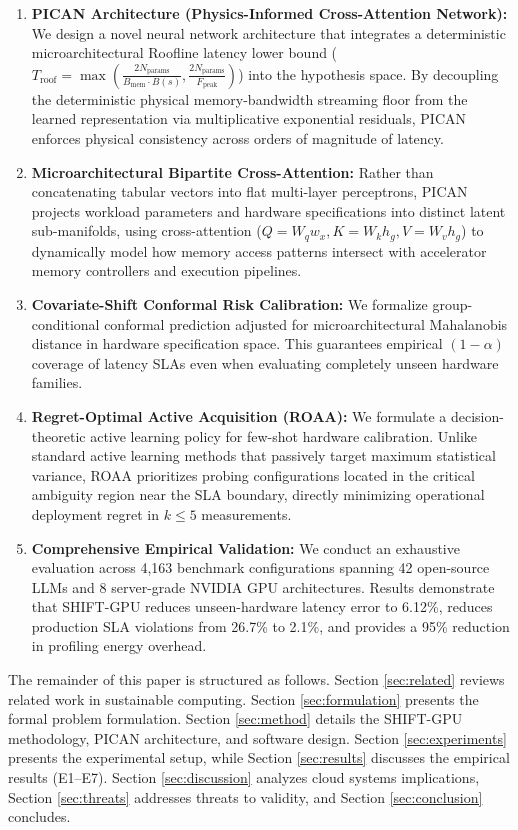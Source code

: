 \documentclass[3p,12pt]{elsarticle}
\begin{document}
\begin{enumerate}
    \item \textbf{PICAN Architecture (Physics-Informed Cross-Attention Network):} We design a novel neural network architecture that integrates a deterministic microarchitectural Roofline latency lower bound ($T_{\text{roof}} = \max\left(\frac{2 N_{\text{params}}}{B_{\text{mem}} \cdot B(s)}, \frac{2 N_{\text{params}}}{F_{\text{peak}}}\right)$) into the hypothesis space. By decoupling the deterministic physical memory-bandwidth streaming floor from the learned representation via multiplicative exponential residuals, PICAN enforces physical consistency across orders of magnitude of latency.
    \item \textbf{Microarchitectural Bipartite Cross-Attention:} Rather than concatenating tabular vectors into flat multi-layer perceptrons, PICAN projects workload parameters and hardware specifications into distinct latent sub-manifolds, using cross-attention ($Q = W_q w_x, K = W_k h_g, V = W_v h_g$) to dynamically model how memory access patterns intersect with accelerator memory controllers and execution pipelines.
    \item \textbf{Covariate-Shift Conformal Risk Calibration:} We formalize group-conditional conformal prediction adjusted for microarchitectural Mahalanobis distance in hardware specification space. This guarantees empirical $(1-\alpha)$ coverage of latency SLAs even when evaluating completely unseen hardware families.
    \item \textbf{Regret-Optimal Active Acquisition (ROAA):} We formulate a decision-theoretic active learning policy for few-shot hardware calibration. Unlike standard active learning methods that passively target maximum statistical variance, ROAA prioritizes probing configurations located in the critical ambiguity region near the SLA boundary, directly minimizing operational deployment regret in $k \le 5$ measurements.
    \item \textbf{Comprehensive Empirical Validation:} We conduct an exhaustive evaluation across 4,163 benchmark configurations spanning 42 open-source LLMs and 8 server-grade NVIDIA GPU architectures. Results demonstrate that SHIFT-GPU reduces unseen-hardware latency error to 6.12\%, reduces production SLA violations from 26.7\% to 2.1\%, and provides a 95\% reduction in profiling energy overhead.
\end{enumerate}

The remainder of this paper is structured as follows. Section \ref{sec:related} reviews related work in sustainable computing. Section \ref{sec:formulation} presents the formal problem formulation. Section \ref{sec:method} details the SHIFT-GPU methodology, PICAN architecture, and software design. Section \ref{sec:experiments} presents the experimental setup, while Section \ref{sec:results} discusses the empirical results (E1--E7). Section \ref{sec:discussion} analyzes cloud systems implications, Section \ref{sec:threats} addresses threats to validity, and Section \ref{sec:conclusion} concludes.
\end{document}

